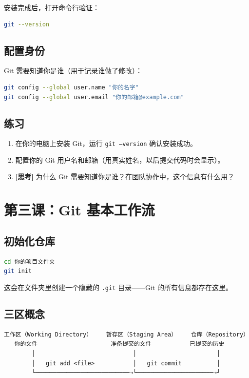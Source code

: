 \documentclass[a4paper,12pt]{ctexart}
\begin{document}
安装完成后，打开命令行验证：

\begin{lstlisting}[language=bash]
git --version
\end{lstlisting}

\subsection*{配置身份}

Git 需要知道你是谁（用于记录谁做了修改）：

\begin{lstlisting}[language=bash]
git config --global user.name "你的名字"
git config --global user.email "你的邮箱@example.com"
\end{lstlisting}

\subsection*{练习}

\begin{enumerate}
  \item 在你的电脑上安装 Git，运行 \texttt{git --version} 确认安装成功。
  \item 配置你的 Git 用户名和邮箱（用真实姓名，以后提交代码时会显示）。
  \item \textbf{[思考]} 为什么 Git 需要知道你是谁？在团队协作中，这个信息有什么用？
\end{enumerate}

\section*{第三课：Git 基本工作流}

\subsection*{初始化仓库}

\begin{lstlisting}[language=bash]
cd 你的项目文件夹
git init
\end{lstlisting}

这会在文件夹里创建一个隐藏的 \texttt{.git} 目录——Git 的所有信息都存在这里。

\subsection*{三区概念}

\begin{verbatim}
工作区（Working Directory）    暂存区（Staging Area）    仓库（Repository）
   你的文件                     准备提交的文件           已提交的历史
        │                            │                       │
        │   git add <file>           │   git commit          │
        └───────────────────────────→└──────────────────────→┘
\end{verbatim}
\end{document}
